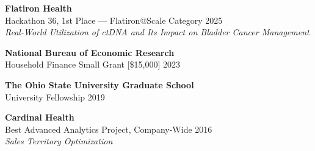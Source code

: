 \textbf{Flatiron Health} \\
Hackathon 36, 1st Place --- Flatiron@Scale Category \hfill 2025 \\
\textit{Real-World Utilization of ctDNA and Its Impact on Bladder Cancer Management}

\bigskip
\textbf{National Bureau of Economic Research} \\
Household Finance Small Grant [\$15,000] \hfill 2023

\bigskip
\textbf{The Ohio State University Graduate School} \\
University Fellowship \hfill 2019

\bigskip
\textbf{Cardinal Health} \\
Best Advanced Analytics Project, Company-Wide \hfill 2016 \\
\textit{Sales Territory Optimization}